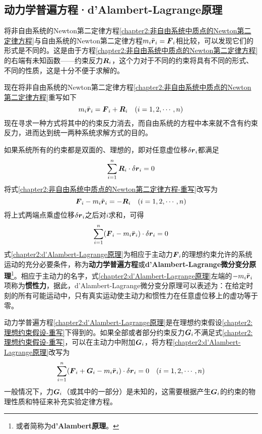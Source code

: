 \subsection{动力学普遍方程·d'Alambert-Lagrange原理}

将非自由系统的Newton第二定律方程\eqref{chapter2:非自由系统中质点的Newton第二定律方程}与自由系统的Newton第二定律方程$m_i\ddot{\boldsymbol{r}}_i=\boldsymbol{F}_i$相比较，可以发现它们的形式是不同的。这是由于方程\eqref{chapter2:非自由系统中质点的Newton第二定律方程}的右端有未知函数——约束反力$\boldsymbol{R}_i$，这个力对于不同的约束将具有不同的形式、不同的性质，这是十分不便于求解的。

现在将非自由系统的Newton第二定律方程\eqref{chapter2:非自由系统中质点的Newton第二定律方程}重写如下
\begin{equation}
	m_i\ddot{\boldsymbol{r}}_i = \boldsymbol{F}_i+\boldsymbol{R}_i\quad (i=1,2,\cdots,n)
	\label{chapter2:非自由系统中质点的Newton第二定律方程-重写}
\end{equation}
现在寻求一种方式将其中的约束反力消去，而自由系统的方程中本来就不含有约束反力，进而达到统一两种系统求解方式的目的。

如果系统所有的约束都是双面的、理想的，即对任意虚位移$\delta\boldsymbol{r}_i$都满足
\begin{equation}
	\sum_{i=1}^n\boldsymbol{R}_i \cdot \delta\boldsymbol{r}_i=0
	\label{chapter2:理想约束假设-重写}
\end{equation}
将式\eqref{chapter2:非自由系统中质点的Newton第二定律方程-重写}改写为
\begin{equation*}
	\boldsymbol{F}_i - m_i \ddot{\boldsymbol{r}}_i = -\boldsymbol{R}_i \quad (i=1,2,\cdots,n)
\end{equation*}
将上式两端点乘虚位移$\delta\boldsymbol{r}_i$之后对$i$求和，可得
\begin{equation}
	\sum_{i=1}^n(\boldsymbol{F}_i - m_i \ddot{\boldsymbol{r}}_i) \cdot \delta \boldsymbol{r}_i = 0
	\label{chapter2:d'Alambert-Lagrange原理}
\end{equation}
式\eqref{chapter2:d'Alambert-Lagrange原理}为相应于主动力$\boldsymbol{F}_i$的理想约束允许的系统运动的充分必要条件，称为{\bf 动力学普遍方程}或{\bf d'Alambert-Lagrange微分变分原理}\footnote{或者简称为{\bf d'Alambert原理}。}。相应于主动力的名字，式\eqref{chapter2:d'Alambert-Lagrange原理}左端的$-m_i\ddot{\boldsymbol{r}}_i$项称为{\bf 惯性力}，据此，d'Alambert-Lagrange微分变分原理可以表述为：在给定时刻的所有可能运动中，只有真实运动使主动力和惯性力在任意虚位移上的虚功等于零。

动力学普遍方程\eqref{chapter2:d'Alambert-Lagrange原理}是在理想约束假设\eqref{chapter2:理想约束假设-重写}下得到的。如果全部或者部分约束反力$\boldsymbol{G}_i$不满足式\eqref{chapter2:理想约束假设-重写}，可以在主动力中附加$\boldsymbol{G}_i$，将方程\eqref{chapter2:d'Alambert-Lagrange原理}改写为
\begin{equation}
	\sum_{i=1}^n (\boldsymbol{F}_i+\boldsymbol{G}_i-m_i\ddot{\boldsymbol{r}}_i)\cdot \delta \boldsymbol{r}_i = 0\quad (i=1,2,\cdots,n)
	\label{chapter2:考虑了非理想约束的d'Alambert-Lagrange原理}
\end{equation}
一般情况下，力$\boldsymbol{G}_i$（或其中的一部分）是未知的，这需要根据产生$\boldsymbol{G}_i$的约束的物理性质和特征来补充实验定律方程。


